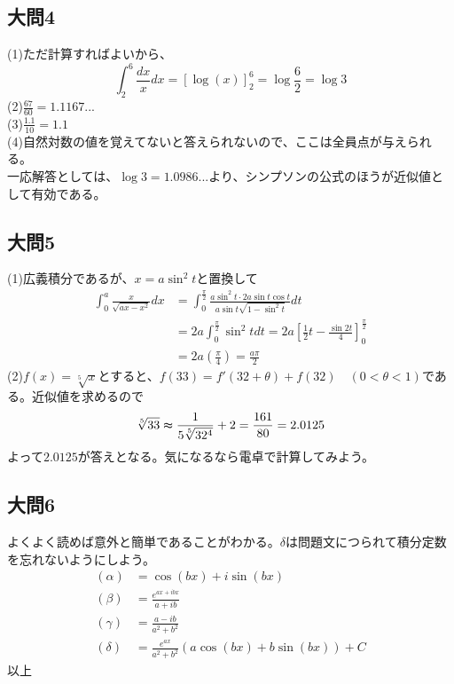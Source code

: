 \documentclass[a4j,dvipdfmx]{jsarticle}
\begin{document}
\subsection*{大問4}
(1)ただ計算すればよいから、
\begin{equation*}
    \int_2^6\frac{dx}{x}dx=[\log(x)]_2^6=\log\frac{6}{2}=\log 3
\end{equation*}
(2)$\displaystyle \frac{67}{60}=1.1167...$\\
(3)$\displaystyle \frac{1.1}{10}=1.1$\\
(4)自然対数の値を覚えてないと答えられないので、ここは全員点が与えられる。\\
一応解答としては、$\log 3=1.0986...$より、シンプソンの公式のほうが近似値として有効である。
\subsection*{大問5}
(1)広義積分であるが、$x=a\sin^2t$と置換して
\begin{align*}
    \int_0^a\frac{x}{\sqrt{ax-x^2}}dx&=\int_0^{\frac{\pi}{2}}\frac{a\sin^2t\cdot 2a\sin t\cos t}{a\sin t \sqrt{1-\sin^2t}}dt\\
    &=2a\int_0^{\frac{\pi}{2}}\sin^2tdt=2a[\frac{1}{2}t-\frac{\sin 2t}{4}]_0^\frac{\pi}{2}\\
    &=2a(\frac{\pi}{4})=\frac{a\pi}{2}
\end{align*}
(2)$f(x)=\sqrt[5]{x}$とすると、$f(33)=f'(32+\theta)+f(32)\quad(0<\theta<1)$である。近似値を求めるので
\begin{equation*}
    \sqrt[5]{33}\thickapprox \frac{1}{5\sqrt[5]{32^4}}+2=\frac{161}{80}=2.0125
\end{equation*}
よって$2.0125$が答えとなる。気になるなら電卓で計算してみよう。
\subsection*{大問6}
よくよく読めば意外と簡単であることがわかる。$\delta$は問題文につられて積分定数を忘れないようにしよう。
\begin{align*}
    (\alpha)&=\cos(bx)+i\sin(bx)\\
    (\beta) &=\frac{e^{ax+ibx}}{a+ib}\\
    (\gamma)&=\frac{a-ib}{a^2+b^2}\\
    (\delta)&=\frac{e^{ax}}{a^2+b^2}(a\cos(bx)+b\sin(bx))+C
\end{align*}
以上
\end{document}
